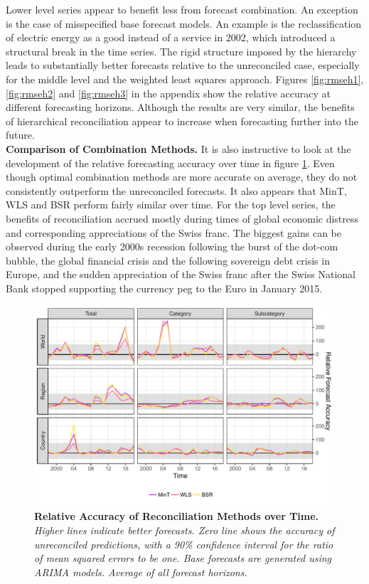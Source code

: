 \documentclass[a4paper,fleqn,11pt]{article}
\begin{document}
Lower level series appear to benefit less from forecast combination. An exception is the case of misspecified base forecast models. An example is the reclassification of electric energy as a good instead of a service in 2002, which introduced a structural break in the time series. The rigid structure imposed by the hierarchy leads to substantially better forecasts relative to the unreconciled case, especially for the middle level and the weighted least squares approach. Figures \ref{fig:rmseh1}, \ref{fig:rmseh2} and \ref{fig:rmseh3} in the appendix show the relative accuracy at different forecasting horizons. Although the results are very similar, the benefits of hierarchical reconciliation appear to increase when forecasting further into the future.\\

\noindent\textbf{Comparison of Combination Methods.} It is also instructive to look at the development of the relative forecasting accuracy over time in figure \ref{fig:rmse_time}. Even though optimal combination methods are more accurate on average, they do not consistently outperform the unreconciled forecasts. It also appears that MinT, WLS and BSR perform fairly similar over time. For the top level series, the benefits of reconciliation accrued mostly during times of global economic distress and corresponding appreciations of the Swiss franc. The biggest gains can be observed during the early 2000s recession following the burst of the dot-com bubble, the global financial crisis and the following sovereign debt crisis in Europe, and the sudden appreciation of the Swiss franc after the Swiss National Bank stopped supporting the currency peg to the Euro in January 2015.
 \begin{figure}[H]
	\includegraphics[width=\textwidth]{fig/fig_eval_rmse_time}
	\caption[Relative Accuracy of Reconciliation Methods over Time]{\textbf{Relative Accuracy of Reconciliation Methods over Time.} \textit{Higher lines indicate better forecasts. Zero line shows the accuracy of unreconciled predictions, with a 90\% confidence interval for the ratio of mean squared errors to be one. Base forecasts are generated using ARIMA models. Average of all forecast horizons.}} \label{fig:rmse_time}
\end{figure}
\end{document}
